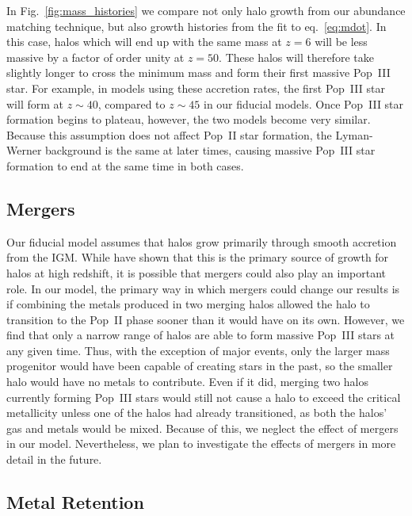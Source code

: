 \documentclass[a4paper,fleqn,usenatbib]{mnras}
\begin{document}
In Fig.~\ref{fig:mass_histories} we compare not only halo growth from our abundance matching technique, but also growth histories from the \citet{trac_2015} fit to eq.~\ref{eq:mdot}. In this case, halos which will end up with the same mass at $z=6$ will be less massive by a factor of order unity at $z=50$. These halos will therefore take slightly longer to cross the minimum mass and form their first massive Pop~III star. For example, in models using these accretion rates, the first Pop~III star will form at $z \sim 40$, compared to $z \sim 45$ in our fiducial models. Once Pop~III star formation begins to plateau, however, the two models become very similar. Because this assumption does not affect Pop~II star formation, the Lyman-Werner background is the same at later times, causing massive Pop~III star formation to end at the same time in both cases.

\subsection{Mergers}
\label{sec:mergers}

Our fiducial model assumes that halos grow primarily through smooth accretion from the IGM. While \citet{behroozi_2015} have shown that this is the primary source of growth for halos at high redshift, it is possible that mergers could also play an important role. In our model, the 
primary way in which mergers could change our results is if combining the metals produced in two merging halos allowed the halo to transition
to the Pop~II phase sooner than it would have on its own. However, we find that only a narrow range of halos are able to form massive Pop~III stars at any given time. 
Thus, with the exception of major events, only the larger mass progenitor would have been capable of creating stars in the past, 
so the smaller halo would have no metals to contribute. Even if it did, merging two halos currently forming Pop~III stars would still not cause a halo to exceed the critical metallicity unless one of the halos had already transitioned, as both the halos' gas and metals would be mixed. Because of this, we neglect the effect of mergers in our model. 
Nevertheless, we plan to investigate the effects of mergers in more detail in the future.

\subsection{Metal Retention}
\label{sec:retention}
\end{document}
